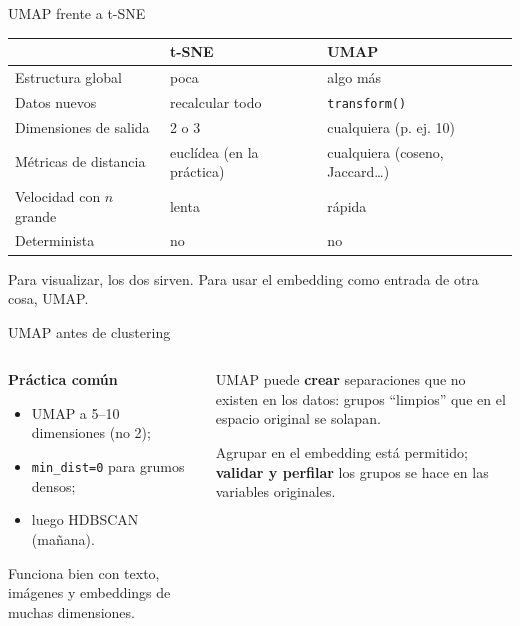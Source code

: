 \documentclass[aspectratio=169,12pt]{beamer}
\newcommand{\colhead}[1]{\textbf{#1}\par\vspace{2pt}}
\newcommand{\hrow}{\rowcolor{mlcream}}
\begin{document}
\begin{frame}{UMAP frente a t-SNE}
  \centering\small
  \begin{tabular}{@{}L{0.34\textwidth} L{0.26\textwidth} L{0.26\textwidth}@{}}
    \toprule
    \hrow & \textbf{t-SNE} & \textbf{UMAP} \\
    \midrule
    Estructura global & poca & algo más \\
    Datos nuevos & recalcular todo & \texttt{transform()} \\
    Dimensiones de salida & 2 o 3 & cualquiera (p. ej. 10) \\
    Métricas de distancia & euclídea (en la práctica) & cualquiera (coseno, Jaccard\ldots) \\
    Velocidad con $n$ grande & lenta & rápida \\
    Determinista & no & no \\
    \bottomrule
  \end{tabular}
  \raggedright
  \begin{keybox}
    \small Para visualizar, los dos sirven. Para usar el embedding como entrada de otra cosa, UMAP.
  \end{keybox}
\end{frame}

\begin{frame}{UMAP antes de clustering}
  \begin{columns}[T]
    \begin{column}{0.48\textwidth}
      \colhead{Práctica común}
      \small
      \begin{itemize}
        \item UMAP a 5--10 dimensiones (no 2);
        \item \texttt{min\_dist=0} para grumos densos;
        \item luego HDBSCAN (mañana).
      \end{itemize}
      \vspace{4pt}
      Funciona bien con texto, imágenes y embeddings de muchas dimensiones.
    \end{column}
    \begin{column}{0.48\textwidth}
      \begin{rulebox}[Riesgo]
        \small UMAP puede \textbf{crear} separaciones que no existen en los datos: grupos ``limpios'' que en el espacio original se solapan.
      \end{rulebox}
      \begin{keybox}[Regla]
        \small Agrupar en el embedding está permitido; \textbf{validar y perfilar} los grupos se hace en las variables originales.
      \end{keybox}
    \end{column}
  \end{columns}
\end{frame}
\end{document}
